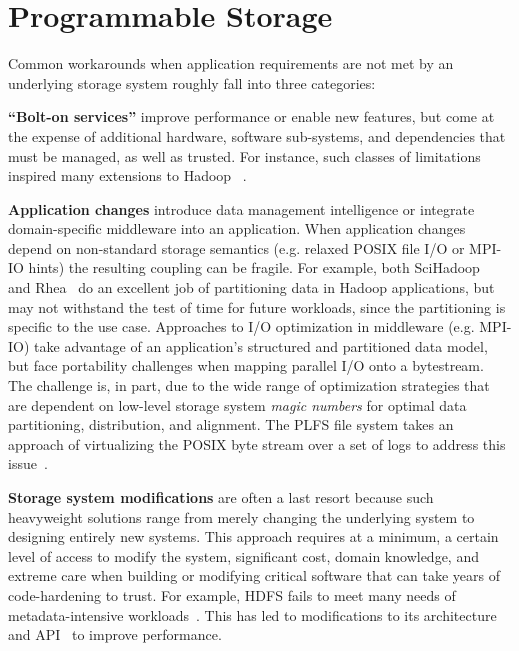 \section{Programmable Storage}
\label{sec:progly}

Common workarounds when application requirements are not met
by an underlying storage system roughly fall into three categories:

{\bf ``Bolt-on services''} improve performance
or enable new features, but come at the expense of additional hardware, software
sub-systems, and dependencies that must be managed, as well as trusted.
For instance, such classes of limitations inspired many extensions to Hadoop
~\cite{bu:vldb2010-haloop, ekanayake:hpdc2010-twister,
ekanayake:escience2008-eglmapreduce, mihailescu:hotstorage2012-mixapart}.

{\bf Application changes} introduce data management intelligence or integrate
domain-specific middleware into an application.  When application changes
depend on non-standard storage semantics (e.g. relaxed POSIX file I/O or
MPI-IO hints) the resulting coupling can be fragile.  For example, both
SciHadoop~\cite{buck:hpc2011-scihadoop} and
Rhea~\cite{gkantsidis:nsdi2013-rhea} do an excellent job of partitioning data
in Hadoop applications, but may not withstand the test of time for future
workloads, since the partitioning is specific to the use case. Approaches to
I/O optimization in middleware (e.g.  MPI-IO) take advantage of an
application's structured and partitioned data model, but face portability
challenges when mapping parallel I/O onto a bytestream. The challenge is, in
part, due to the wide range of optimization strategies that are dependent on
low-level storage system \emph{magic numbers} for optimal data partitioning,
distribution, and alignment. The PLFS file system takes an approach of
virtualizing the POSIX byte stream over a set of logs to address this
issue~\cite{plfs}.

{\bf Storage system modifications} are often a last resort because such
heavyweight solutions range from merely changing the underlying system to
designing entirely new systems. This approach requires at a minimum, a certain level of
access to modify the system, significant cost, domain knowledge, and extreme care when building or
modifying critical software that can take years of code-hardening to trust.
For example, HDFS fails to meet many needs of metadata-intensive
workloads~\cite{shvachko:login2012-hdfs-scalability}.  This has led to
modifications to its architecture and API~\cite{balmin:sigmod2012-clydesdale}
to improve performance.

